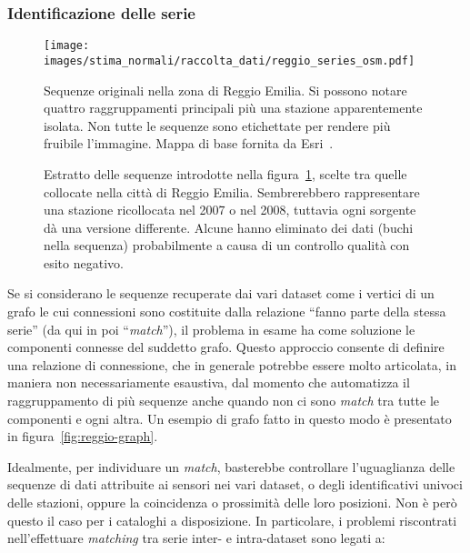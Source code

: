 \subsubsection{Identificazione delle serie}
\begin{figure}[ht]
  \centering
  \texttt{[image: images/stima\_normali/raccolta\_dati/reggio\_series\_osm.pdf]}
  \caption{Sequenze originali nella zona di Reggio Emilia. Si possono notare quattro raggruppamenti principali più una stazione apparentemente isolata. Non tutte le sequenze sono etichettate per rendere più fruibile l'immagine. Mappa di base fornita da Esri~\autocite{esriWorldTopographicMap2013}.}\label{fig:reggio-osm}
\end{figure}
\begin{figure}[ht]
  \centering
  
  \caption{Estratto delle sequenze introdotte nella figura~\ref{fig:reggio-osm}, scelte tra quelle collocate nella città di Reggio Emilia. Sembrerebbero rappresentare una stazione ricollocata nel 2007 o nel 2008, tuttavia ogni sorgente dà una versione differente. Alcune hanno eliminato dei dati (buchi nella sequenza) probabilmente a causa di un controllo qualità con esito negativo.}\label{fig:reggio-plot}
\end{figure}
Se si considerano le sequenze recuperate dai vari dataset come i vertici di un grafo le cui connessioni sono costituite dalla relazione ``fanno parte della stessa serie'' (da qui in poi ``\emph{match}''), il problema in esame ha come soluzione le componenti connesse del suddetto grafo. Questo approccio consente di definire una relazione di connessione, che in generale potrebbe essere molto articolata, in maniera non necessariamente esaustiva, dal momento che automatizza il raggruppamento di più sequenze anche quando non ci sono \emph{match} tra tutte le componenti e ogni altra. Un esempio di grafo fatto in questo modo è presentato in figura~\ref{fig:reggio-graph}.

Idealmente, per individuare un \emph{match}, basterebbe controllare l'uguaglianza delle sequenze di dati attribuite ai sensori nei vari dataset, o degli identificativi univoci delle stazioni, oppure la coincidenza o prossimità delle loro posizioni. Non è però questo il caso per i cataloghi a disposizione. In particolare, i problemi riscontrati nell'effettuare \emph{matching} tra serie inter- e intra-dataset sono legati a:

